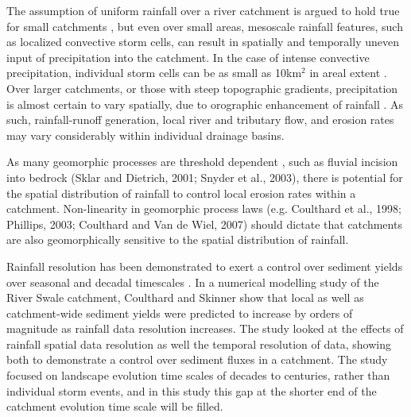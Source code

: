  The assumption of uniform rainfall over a river catchment is argued to hold true for small catchments \citep{Solyom2004,Tucker2010}, but even over small areas, mesoscale rainfall features, such as localized convective storm cells, can result in spatially and temporally uneven input of precipitation into the catchment. In the case of intense convective precipitation, individual storm cells can be as small as 10km$^2$ in areal extent  \citep{weisman1986characteristics,vonhardenberg2003shape}. Over larger catchments, or those with steep topographic gradients, precipitation is almost certain to vary spatially, due to orographic enhancement of rainfall \citep{Roe2003}. As such, rainfall-runoff generation, local river and tributary flow, and erosion rates may vary considerably within individual drainage basins. 
 
As many geomorphic processes are threshold dependent \citep{schumm1979}, such as fluvial incision into bedrock \citep{sklar2001,snyder2003}(Sklar and Dietrich, 2001; Snyder et al., 2003), there is potential for the spatial distribution of rainfall to control local erosion rates within a catchment. Non-linearity in geomorphic process laws (e.g. Coulthard et al., 1998; Phillips, 2003; Coulthard and Van de Wiel, 2007) should dictate that catchments are also geomorphically sensitive to the spatial distribution of rainfall. 

Rainfall resolution has been demonstrated to exert a control over sediment yields over seasonal and decadal timescales \citep{coulthard2016sensitivity}. In a numerical modelling study of the River Swale catchment, Coulthard and Skinner show that local as well as catchment-wide sediment yields were predicted to increase by orders of magnitude as rainfall data resolution increases. The study looked at the effects of rainfall spatial data resolution as well the temporal resolution of data, showing both to demonstrate a control over sediment fluxes in a catchment. The study focused on landscape evolution time scales of decades to centuries, rather than individual storm events, and in this study this gap at the shorter end of the catchment evolution time scale will be filled. 



